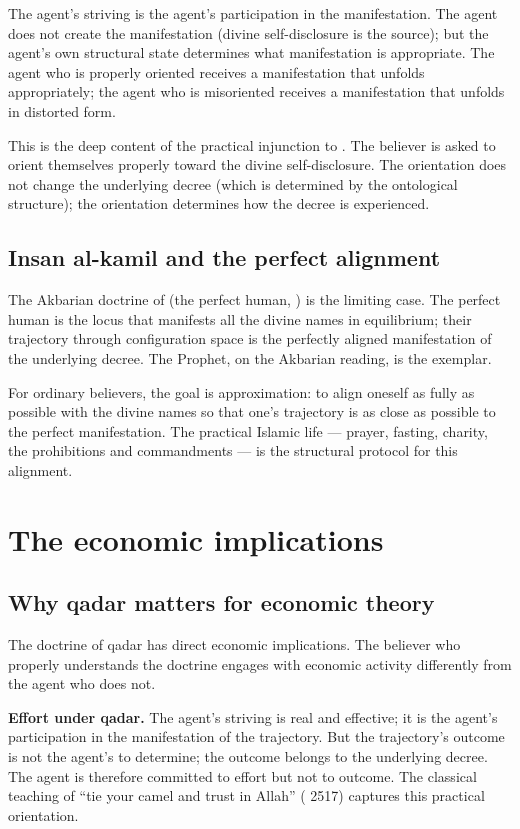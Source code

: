 The agent's striving is the agent's participation in the
manifestation. The agent does not create the manifestation
(divine self-disclosure is the source); but the agent's own
structural state determines what manifestation is appropriate.
The agent who is properly oriented receives a manifestation that
unfolds appropriately; the agent who is misoriented receives a
manifestation that unfolds in distorted form.

This is the deep content of the practical injunction to
. The believer is asked to orient themselves
properly toward the divine self-disclosure. The orientation does
not change the underlying decree (which is determined by the
ontological structure); the orientation determines how the decree
is experienced.

\subsection{Insan al-kamil and the perfect alignment}

The Akbarian doctrine of  (the perfect human,
) is the limiting case. The perfect human
is the locus that manifests all the divine names in equilibrium;
their trajectory through configuration space is the perfectly
aligned manifestation of the underlying decree. The Prophet, on
the Akbarian reading, is the exemplar.

For ordinary believers, the goal is approximation: to align
oneself as fully as possible with the divine names so that one's
trajectory is as close as possible to the perfect manifestation.
The practical Islamic life --- prayer, fasting, charity, the
prohibitions and commandments --- is the structural protocol for
this alignment.

\section{The economic implications}
\label{sec:qad-economic}

\subsection{Why qadar matters for economic theory}

The doctrine of qadar has direct economic implications. The
believer who properly understands the doctrine engages with
economic activity differently from the agent who does not.

\textbf{Effort under qadar.} The agent's striving is real and
effective; it is the agent's participation in the manifestation
of the trajectory. But the trajectory's outcome is not the
agent's to determine; the outcome belongs to the underlying
decree. The agent is therefore committed to effort but not to
outcome. The classical teaching of ``tie your camel and trust in
Allah'' ( 2517) captures this practical
orientation.


